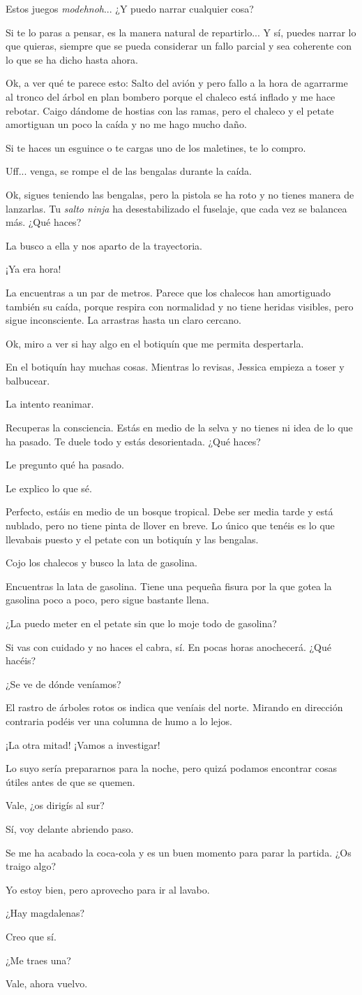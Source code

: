 \documentclass[10pt, a5paper, twocolumn]{article}
\newenvironment{dialogue}
    {\begin{description}[leftmargin=!,align=right,labelwidth=0.cm]}
    {\end{description}}
\newcommand\A{\item[\raisebox{-0.25em}{\scalebox{0.75}{\bctetraedre}}]}
\newcommand\B{\item[\raisebox{-0.25em}{\scalebox{0.75}{\bccube}}]}
\newcommand\E{\item[\raisebox{-0.25em}{\scalebox{0.75}{\bcicosaedre}}]}
\begin{document}
\begin{dialogue}
        \B Estos juegos \emph{modehnoh}... ¿Y puedo narrar cualquier cosa?
        \E Si te lo paras a pensar, es la manera natural de repartirlo... Y sí, puedes narrar lo que quieras, siempre que se pueda considerar un fallo parcial y sea coherente con lo que se ha dicho hasta ahora.
        \B Ok, a ver qué te parece esto: Salto del avión y pero fallo a la hora de agarrarme al tronco del árbol en plan bombero porque el chaleco está inflado y me hace rebotar. Caigo dándome de hostias con las ramas, pero el chaleco y el petate amortiguan un poco la caída y no me hago mucho daño.
        \E Si te haces un esguince o te cargas uno de los maletines, te lo compro.
        \B Uff... venga, se rompe el de las bengalas durante la caída.
        \E Ok, sigues teniendo las bengalas, pero la pistola se ha roto y no tienes manera de lanzarlas. Tu \emph{salto ninja} ha desestabilizado el fuselaje, que cada vez se balancea más. ¿Qué haces?
        \B La busco a ella y nos aparto de la trayectoria.
        \A ¡Ya era hora!
        \E La encuentras a un par de metros. Parece que los chalecos han amortiguado también su caída, porque respira con normalidad y no tiene heridas visibles, pero sigue inconsciente. La arrastras hasta un claro cercano.
        \B Ok, miro a ver si hay algo en el botiquín que me permita despertarla.
        \E En el botiquín hay muchas cosas. Mientras lo revisas, Jessica empieza a toser y balbucear.
        \B La intento reanimar.
        \E Recuperas la consciencia. Estás en medio de la selva y no tienes ni idea de lo que ha pasado. Te duele todo y estás desorientada. ¿Qué haces?
        \A Le pregunto qué ha pasado.
        \B Le explico lo que sé.
        \E Perfecto, estáis en medio de un bosque tropical. Debe ser media tarde y está nublado, pero no tiene pinta de llover en breve. Lo único que tenéis es lo que llevabais puesto y el petate con un botiquín y las bengalas.
        \B Cojo los chalecos y busco la lata de gasolina.
        \E Encuentras la lata de gasolina. Tiene una pequeña fisura por la que gotea la gasolina poco a poco, pero sigue bastante llena. 
        \B ¿La puedo meter en el petate sin que lo moje todo de gasolina?
        \E Si vas con cuidado y no haces el cabra, sí. En pocas horas anochecerá. ¿Qué hacéis?
        \A ¿Se ve de dónde veníamos?
        \E El rastro de árboles rotos os indica que veníais del norte. Mirando en dirección contraria podéis ver una columna de humo a lo lejos.
        \A ¡La otra mitad! ¡Vamos a investigar!
        \B Lo suyo sería prepararnos para la noche, pero quizá podamos encontrar cosas útiles antes de que se quemen.
        \E Vale, ¿os dirigís al sur?
        \B Sí, voy delante abriendo paso.
        \E Se me ha acabado la coca-cola y es un buen momento para parar la partida. ¿Os traigo algo?
        \B Yo estoy bien, pero aprovecho para ir al lavabo.
        \A ¿Hay magdalenas?
        \B Creo que sí.
        \A ¿Me traes una?
        \E Vale, ahora vuelvo.
    \end{dialogue}
\end{document}
